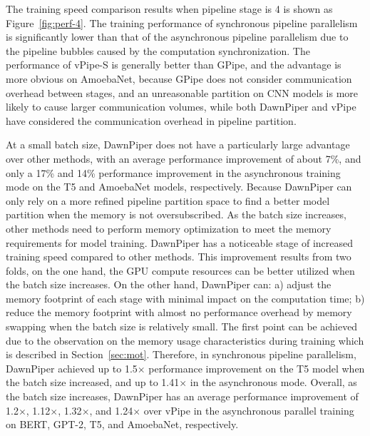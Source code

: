 The training speed comparison results when pipeline stage is 4 is shown as Figure~\ref{fig:perf-4}.
The training performance of synchronous pipeline parallelism
is significantly lower than that of the asynchronous pipeline parallelism
due to the pipeline bubbles caused by the computation synchronization.
The performance of vPipe-S is generally better than GPipe,
and the advantage is more obvious on AmoebaNet,
because GPipe does not consider communication overhead between stages,
and an unreasonable partition on CNN models is more
likely to cause larger communication volumes,
while both DawnPiper and vPipe have considered the communication overhead in pipeline partition.

At a small batch size, DawnPiper does not have a particularly large advantage over other methods,
with an average performance improvement of about 7\%, and only a 17\% and 14\% performance improvement
in the asynchronous training mode on the T5 and AmoebaNet models, respectively.
Because DawnPiper can only rely on a more refined pipeline partition space
to find a better model partition when the memory is not oversubscribed.
As the batch size increases, other methods need to
perform memory optimization to meet the memory requirements for model training.
DawnPiper has a noticeable stage of increased training speed compared to other methods.
This improvement results from two folds, on the one hand,
the GPU compute resources can be better utilized when the batch size increases.
On the other hand, DawnPiper can:
a) adjust the memory footprint of each stage with minimal impact on the computation time;
b) reduce the memory footprint with almost no performance overhead by memory swapping
when the batch size is relatively small.
The first point can be achieved due to the observation on the memory usage
characteristics during training which is described in Section~\ref{sec:mot}.
Therefore, in synchronous pipeline parallelism,
DawnPiper achieved up to 1.5$\times$ performance improvement
on the T5 model when the batch size increased,
and up to 1.41$\times$ in the asynchronous mode.
Overall, as the batch size increases,
DawnPiper has an average performance improvement of 1.2$\times$, 1.12$\times$,
1.32$\times$, and 1.24$\times$ over vPipe in the asynchronous parallel training
on BERT, GPT-2, T5, and AmoebaNet, respectively.

